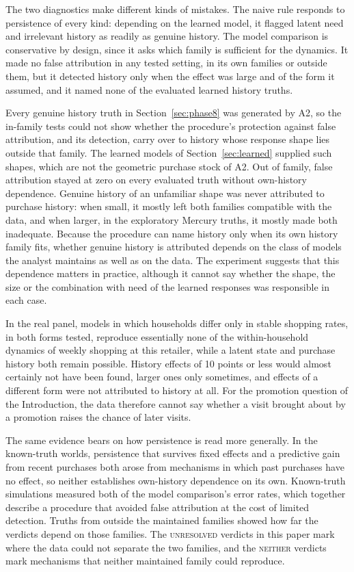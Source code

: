 \documentclass[11pt]{article}
\newcommand{\verdict}[1]{\textsc{#1}}
\begin{document}
The two diagnostics make different kinds of mistakes. The naive rule responds to
persistence of every kind: depending on the learned model, it flagged latent need and
irrelevant history as readily as genuine history. The model comparison is conservative by
design, since it asks which family is sufficient for the dynamics. It made no false
attribution in any tested setting, in its own families or outside them, but it detected history
only when the effect was large and of the form it assumed, and it named none of the evaluated
learned history truths.

Every genuine history truth in Section~\ref{sec:phase8} was generated by A2, so the in-family
tests could not show whether the procedure's protection against false attribution, and its
detection, carry over to history whose response shape lies outside that family. The learned
models of Section~\ref{sec:learned} supplied such shapes, which are not the geometric purchase
stock of A2. Out of family, false attribution stayed at zero on
every evaluated truth without own-history dependence. Genuine history of an unfamiliar shape
was never attributed to purchase history: when small, it mostly left both families compatible
with the data, and when larger, in the exploratory Mercury truths, it mostly made both
inadequate. Because the procedure can name history only when its own history family fits, whether
genuine history is attributed depends on the class of models the analyst maintains as well as
on the data. The experiment suggests that this dependence matters in practice, although it cannot
say whether the shape, the size or the combination with need of the learned responses was
responsible in each case.

In the real panel, models in which households differ only in stable shopping rates, in both
forms tested, reproduce essentially none of the within-household dynamics of weekly shopping at
this retailer, while a latent state and purchase history both remain possible. History effects
of 10 points or less would almost certainly not have been found, larger ones only sometimes,
and effects of a different form were not attributed to history at all. For the promotion
question of the Introduction, the data therefore cannot say whether a visit brought about by a
promotion raises the chance of later visits.

The same evidence bears on how persistence is read more generally. In the known-truth worlds,
persistence that survives fixed effects and a predictive gain from recent purchases both arose
from mechanisms in which past purchases have no effect, so neither establishes own-history
dependence on its own. Known-truth simulations measured both of the model comparison's error rates,
which together describe a procedure that avoided false attribution at the cost of limited
detection. Truths from outside the maintained families
showed how far the verdicts depend on those families. The \verdict{unresolved} verdicts in
this paper mark where the data could not separate the two families, and the
\verdict{neither} verdicts mark mechanisms that neither maintained family could reproduce.
\end{document}
